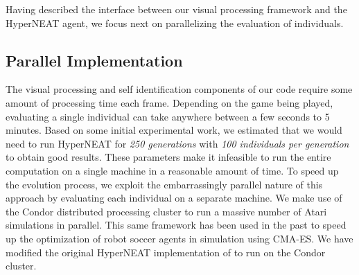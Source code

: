 \documentclass{acm_proc_article-sp}
\begin{document}
Having described the interface between our visual processing framework and the HyperNEAT agent, we focus next on parallelizing the evaluation of individuals.

\subsection{Parallel Implementation}
\label{sec:condor}
The visual processing and self identification components of our code require some amount of processing time each frame. Depending on the game being played, evaluating a single individual can take anywhere between a few seconds to 5 minutes. Based on some initial experimental work, we estimated that we would need to run HyperNEAT for \textit{250 generations} with \textit{100 individuals per generation} to obtain good results. These parameters make it infeasible to run the entire computation on a single machine in a reasonable amount of time. To speed up the evolution process, we exploit the embarrassingly parallel nature of this approach by evaluating each individual on a separate machine. We make use of the Condor distributed processing cluster \cite{thain2005distributed} to run a massive number of Atari simulations in parallel. This same framework has been used in the past to speed up the optimization of robot soccer agents in simulation using CMA-ES\cite{Urieli+MKBS:2010}. We have modified the original HyperNEAT implementation of \cite{verbancsics10} to run on the Condor cluster.

\end{document}

